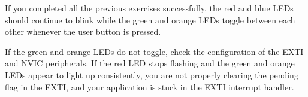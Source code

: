 \documentclass[openany,11pt,fleqn]{book} %
\newcommand{\code}[3]{
    \begin{figure}[]
        \colorbox{gray!20!white}{
            \parbox{\linewidth-2\fboxsep} {
                \centering 
                
            }
        }
        \caption{#2}
        \label{#3}
    \end{figure}
}
\begin{document}
\begin{assignment}
    \noindent If you completed all the previous exercises successfully, the red and blue LEDs should continue to blink while the green and orange LEDs toggle between each other whenever the user button is pressed. 
    
    If the green and orange LEDs do not toggle, check the configuration of the EXTI and NVIC peripherals. If the red LED stops flashing and the green and orange LEDs appear to light up consistently, you are not properly clearing the pending flag in the EXTI, and your application is stuck in the EXTI interrupt handler.
    
\end{assignment}


%    
%    
%    
%    
\end{document}
